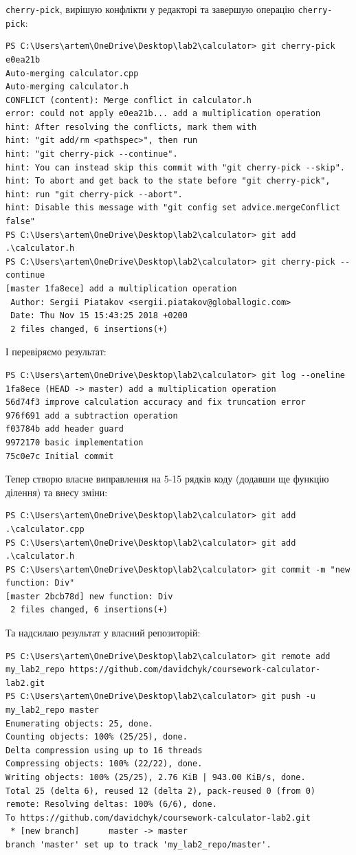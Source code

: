 \documentclass[a4paper,12pt]{article}
\begin{document}
    \texttt{cherry-pick}, вирішую конфлікти у редакторі та завершую операцію \texttt{cherry-pick}:

    \begin{verbatim}
PS C:\Users\artem\OneDrive\Desktop\lab2\calculator> git cherry-pick e0ea21b
Auto-merging calculator.cpp
Auto-merging calculator.h
CONFLICT (content): Merge conflict in calculator.h
error: could not apply e0ea21b... add a multiplication operation
hint: After resolving the conflicts, mark them with
hint: "git add/rm <pathspec>", then run
hint: "git cherry-pick --continue".
hint: You can instead skip this commit with "git cherry-pick --skip".
hint: To abort and get back to the state before "git cherry-pick",
hint: run "git cherry-pick --abort".
hint: Disable this message with "git config set advice.mergeConflict false"
PS C:\Users\artem\OneDrive\Desktop\lab2\calculator> git add .\calculator.h  
PS C:\Users\artem\OneDrive\Desktop\lab2\calculator> git cherry-pick --continue 
[master 1fa8ece] add a multiplication operation
 Author: Sergii Piatakov <sergii.piatakov@globallogic.com>
 Date: Thu Nov 15 15:43:25 2018 +0200
 2 files changed, 6 insertions(+)
    \end{verbatim}

    І перевіряємо результат:

    \begin{verbatim}
PS C:\Users\artem\OneDrive\Desktop\lab2\calculator> git log --oneline
1fa8ece (HEAD -> master) add a multiplication operation
56d74f3 improve calculation accuracy and fix truncation error
976f691 add a subtraction operation
f03784b add header guard
9972170 basic implementation
75c0e7c Initial commit
    \end{verbatim}

    Тепер створю власне виправлення на 5-15 рядків коду (додавши ще функцію ділення) та внесу зміни:
    \begin{verbatim}
PS C:\Users\artem\OneDrive\Desktop\lab2\calculator> git add .\calculator.cpp
PS C:\Users\artem\OneDrive\Desktop\lab2\calculator> git add .\calculator.h  
PS C:\Users\artem\OneDrive\Desktop\lab2\calculator> git commit -m "new function: Div" 
[master 2bcb78d] new function: Div
 2 files changed, 6 insertions(+)
    \end{verbatim}

    Та надсилаю результат у власний репозиторій:

    \begin{verbatim}
PS C:\Users\artem\OneDrive\Desktop\lab2\calculator> git remote add my_lab2_repo https://github.com/davidchyk/coursework-calculator-lab2.git
PS C:\Users\artem\OneDrive\Desktop\lab2\calculator> git push -u my_lab2_repo master
Enumerating objects: 25, done.
Counting objects: 100% (25/25), done.
Delta compression using up to 16 threads
Compressing objects: 100% (22/22), done.
Writing objects: 100% (25/25), 2.76 KiB | 943.00 KiB/s, done.
Total 25 (delta 6), reused 12 (delta 2), pack-reused 0 (from 0)
remote: Resolving deltas: 100% (6/6), done.
To https://github.com/davidchyk/coursework-calculator-lab2.git
 * [new branch]      master -> master
branch 'master' set up to track 'my_lab2_repo/master'.
    \end{verbatim}
\end{document}

